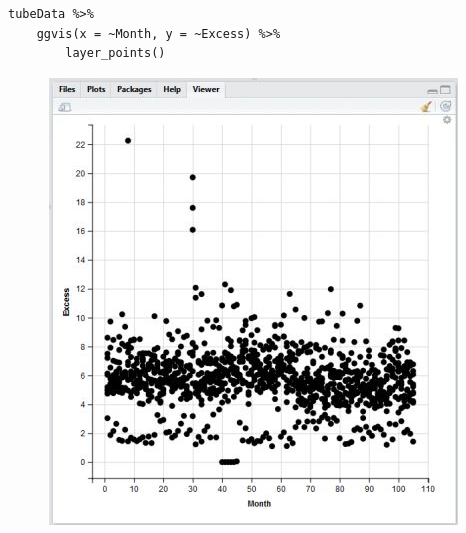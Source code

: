 \documentclass{beamer}
\begin{document}
\begin{frame}[fragile]
\begin{framed}
\begin{verbatim}
tubeData %>%
    ggvis(x = ~Month, y = ~Excess) %>%
        layer_points()
\end{verbatim}
\end{framed}
\begin{figure}
\centering
\includegraphics[width=0.5\linewidth]{got-ggvisplot1}
\end{figure}

\end{frame}











% 
\end{document}
